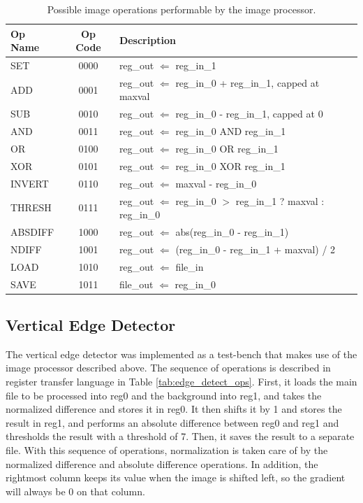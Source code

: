 \documentclass[a4paper, 10pt, titlepage]{article}
\begin{document}
\begin{table}[htb]
    \centering
    \begin{tabular}[c]{ l | c | p{10cm} }
        \textbf{Op Name} & \textbf{Op Code} & \textbf{Description} \\
        \hline
        SET & 0000 & reg\_out $\Leftarrow$ reg\_in\_1 \\
        ADD & 0001 & reg\_out $\Leftarrow$ reg\_in\_0 + reg\_in\_1, capped at maxval \\
        SUB & 0010 & reg\_out $\Leftarrow$ reg\_in\_0 - reg\_in\_1, capped at 0 \\
        AND & 0011 & reg\_out $\Leftarrow$ reg\_in\_0 AND reg\_in\_1 \\
        OR & 0100 & reg\_out $\Leftarrow$ reg\_in\_0 OR reg\_in\_1 \\
        XOR & 0101 & reg\_out $\Leftarrow$ reg\_in\_0 XOR reg\_in\_1 \\
        INVERT & 0110 & reg\_out $\Leftarrow$ maxval - reg\_in\_0 \\
        THRESH & 0111 & reg\_out $\Leftarrow$ reg\_in\_0 $>$ reg\_in\_1 ? maxval : reg\_in\_0 \\
        ABSDIFF & 1000 & reg\_out $\Leftarrow$ abs(reg\_in\_0 - reg\_in\_1) \\
        NDIFF & 1001 & reg\_out $\Leftarrow$ (reg\_in\_0 - reg\_in\_1 + maxval) / 2 \\
        LOAD & 1010 & reg\_out $\Leftarrow$ file\_in \\
        SAVE & 1011 & file\_out $\Leftarrow$ reg\_in\_0 \\
    \end{tabular}
    \caption{Possible image operations performable by the image processor.}
    \label{tab:image_operations}
\end{table}

\subsection{Vertical Edge Detector}

The vertical edge detector was implemented as a test-bench that makes use of the image processor described above. The sequence of operations is described in register transfer language in Table \ref{tab:edge_detect_ops}. First, it loads the main file to be processed into reg0 and the background into reg1, and takes the normalized difference and stores it in reg0. It then shifts it by 1 and stores the result in reg1, and performs an absolute difference between reg0 and reg1 and thresholds the result with a threshold of 7. Then, it saves the result to a separate file. With this sequence of operations, normalization is taken care of by the normalized difference and absolute difference operations. In addition, the rightmost column keeps its value when the image is shifted left, so the gradient will always be 0 on that column.
\end{document}
